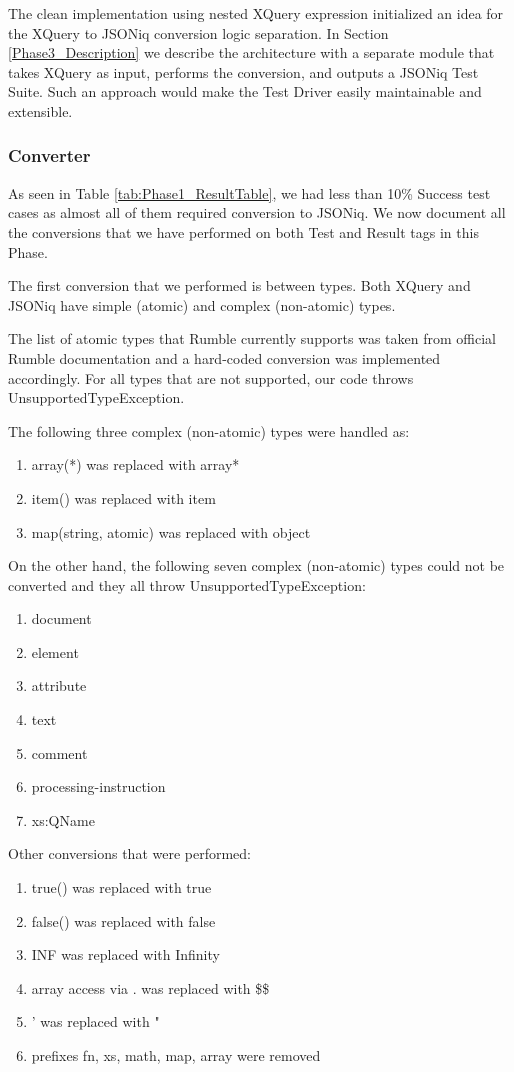 The clean implementation using nested XQuery expression initialized an idea for the XQuery to JSONiq conversion logic separation. In Section \ref{Phase3_Description} we describe the architecture with a separate module that takes XQuery as input, performs the conversion, and outputs a JSONiq Test Suite. Such an approach would make the Test Driver easily maintainable and extensible.

\subsubsection{Converter}
\label{Phase2_Converter}
As seen in Table \ref{tab:Phase1_ResultTable}, we had less than 10\% Success test cases as almost all of them required conversion to JSONiq. We now document all the conversions that we have performed on both Test and Result tags in this Phase. 

The first conversion that we performed is between types. Both XQuery and JSONiq have simple (atomic) and complex (non-atomic) types. 

The list of atomic types that Rumble currently supports was taken from official Rumble documentation \cite{RumbleSupportedTypes} and a hard-coded conversion was implemented accordingly. For all types that are not supported, our code throws UnsupportedTypeException. 

The following three complex (non-atomic) types were handled as:
\begin{enumerate}
	\item array(*) was replaced with array*
	\item item() was replaced with item
	\item map(string, atomic) was replaced with object 
\end{enumerate}

On the other hand, the following seven complex (non-atomic) types could not be converted and they all throw UnsupportedTypeException:
\begin{enumerate}
	\item document
	\item element
	\item attribute
	\item text
	\item comment
	\item processing-instruction
	\item xs:QName
\end{enumerate}

Other conversions that were performed:
\begin{enumerate}
	\item true() was replaced with true
	\item false() was replaced with false
	\item INF was replaced with Infinity
	\item array access via . was replaced with \$\$
	\item ' was replaced with "
	\item prefixes fn, xs, math, map, array were removed
\end{enumerate}

